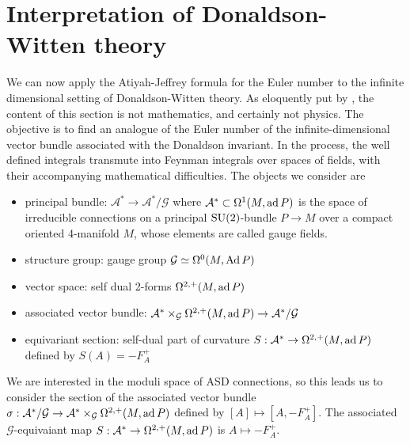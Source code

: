 \section{Interpretation of Donaldson-Witten theory}
We can now apply the Atiyah-Jeffrey formula for the Euler number to the infinite 
dimensional setting of Donaldson-Witten theory. As eloquently put by \citet{naber},
the content of this section is not mathematics, and certainly not physics. The
objective is to find an analogue of the Euler number of the
infinite-dimensional vector bundle associated with the Donaldson invariant. In
the process, the well defined integrals transmute into Feynman integrals
over spaces of fields, with their accompanying mathematical difficulties.  
The objects we consider are 
\begin{itemize}
	\item principal bundle: $\mathcal{A}^* \to \mathcal{A}^* /\mathcal{G}$ where 
	$\mathcal{A}^* \subset \Omega^1(M,\operatorname{ad} P)$ is the
	space of irreducible connections   on a principal $\operatorname{SU}(2)$-bundle  $P\to M$
	over a compact oriented 4-manifold $M$, whose elements are called gauge
	fields.
	\item structure group: gauge group $\mathcal{G}\simeq \Omega^0(M,\operatorname{Ad} P)$
	\item vector space: self dual 2-forms $\Omega^{2,+}(M,\operatorname{ad} P)$ 
	\item associated vector bundle: $\mathcal{A}^* \times_\mathcal{G}
		\Omega^{2,+}(M,\operatorname{ad} P)  \to \mathcal{A}^* /\mathcal{G}$
	\item equivariant section: self-dual part of curvature $S : \mathcal{A}^* \to
		\Omega^{2,+}(M,\operatorname{ad} P)$ defined by $S(A)=-F_A^+$
\end{itemize}

We are interested in the moduli space of ASD connections, so this leads us to
consider the section of the associated vector bundle 
$\sigma : \mathcal{A}^* /\mathcal{G} \to \mathcal{A}^*\times_\mathcal{G}
\Omega^{2,+}(M,\operatorname{ad} P)$ defined by $[A]\mapsto [A,-F_A^+]$. 
The associated $\mathcal{G}$-equivaiant map $S : \mathcal{A}^* \to
\Omega^{2,+}(M,\operatorname{ad} P)$ is $A \mapsto -F_A^+$.

